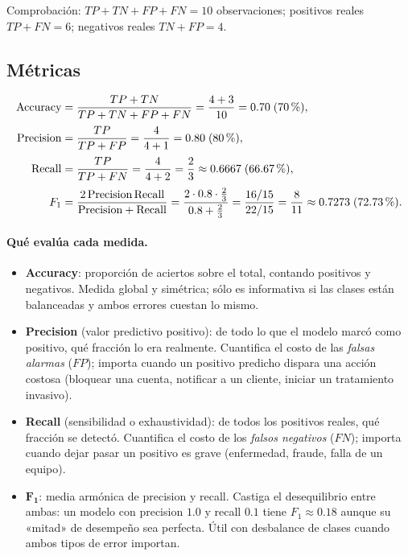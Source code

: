 \documentclass[11pt,a4paper]{article}
\begin{document}
Comprobación: $TP+TN+FP+FN = 10$ observaciones; positivos reales
$TP+FN = 6$; negativos reales $TN+FP = 4$.

\subsection{Métricas}

\begin{align}
\text{Accuracy} &= \frac{TP+TN}{TP+TN+FP+FN} = \frac{4+3}{10} = 0.70\;\text{(70\,\%)},\\[2pt]
\text{Precision} &= \frac{TP}{TP+FP} = \frac{4}{4+1} = 0.80\;\text{(80\,\%)},\\[2pt]
\text{Recall} &= \frac{TP}{TP+FN} = \frac{4}{4+2} = \frac{2}{3} \approx 0.6667\;\text{(66.67\,\%)},\\[2pt]
F_1 &= \frac{2\,\text{Precision}\,\text{Recall}}{\text{Precision}+\text{Recall}}
= \frac{2\cdot 0.8\cdot \tfrac{2}{3}}{0.8+\tfrac{2}{3}}
= \frac{16/15}{22/15} = \frac{8}{11} \approx 0.7273\;\text{(72.73\,\%)}.
\end{align}

\paragraph{Qué evalúa cada medida.}
\begin{itemize}
\item \textbf{Accuracy}: proporción de aciertos sobre el total, contando
  positivos y negativos. Medida global y simétrica; sólo es informativa si las
  clases están balanceadas y ambos errores cuestan lo mismo.
\item \textbf{Precision} (valor predictivo positivo): de todo lo que el modelo
  marcó como positivo, qué fracción lo era realmente. Cuantifica el costo de las
  \emph{falsas alarmas} ($FP$); importa cuando un positivo predicho dispara una
  acción costosa (bloquear una cuenta, notificar a un cliente, iniciar un
  tratamiento invasivo).
\item \textbf{Recall} (sensibilidad o exhaustividad): de todos los positivos
  reales, qué fracción se detectó. Cuantifica el costo de los \emph{falsos
  negativos} ($FN$); importa cuando dejar pasar un positivo es grave (enfermedad,
  fraude, falla de un equipo).
\item $\boldsymbol{F_1}$: media armónica de precision y recall. Castiga el
  desequilibrio entre ambas: un modelo con precision $1.0$ y recall $0.1$ tiene
  $F_1 \approx 0.18$ aunque su «mitad» de desempeño sea perfecta. Útil con
  desbalance de clases cuando ambos tipos de error importan.
\end{itemize}
\end{document}
